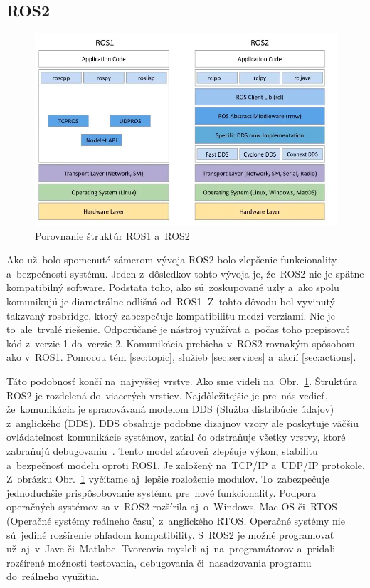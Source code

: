 \subsection{ROS2}
\label{subsec:ros2}

\begin{figure}[!htbp]
	\centering
	\includegraphics[width=15cm]{img/strukturaRos1Ros2.png}
	\caption{Porovnanie štruktúr ROS1 a~ROS2~\cite{comparison}}
	\label{fig:struktury}
\end{figure}

Ako už~bolo spomenuté zámerom vývoja ROS2 bolo zlepšenie funkcionality a~bezpečnosti systému. Jeden z~dôsledkov tohto vývoja je, že~ROS2
nie je spätne kompatibilný software. Podstata toho, ako sú~zoskupované uzly a~ako spolu komunikujú je diametrálne odlišná od~ROS1. Z~tohto dôvodu
bol vyvinutý takzvaný rosbridge, ktorý zabezpečuje kompatibilitu medzi verziami. Nie je to~ale~trvalé riešenie. Odporúčané je nástroj
využívať a~počas toho prepisovať kód z~verzie 1 do~verzie 2. Komunikácia prebieha v~ROS2 rovnakým spôsobom ako v~ROS1. Pomocou tém
\ref{sec:topic}, služieb \ref{sec:services} a~akcií \ref{sec:actions}.

Táto podobnosť končí na~najvyššej vrstve. Ako sme videli na~Obr.~\ref{fig:struktury}. Štruktúra ROS2 je rozdelená do~viacerých vrstiev.
Najdôležitejšie je pre~nás vedieť, že~komunikácia je spracovávaná modelom DDS (Služba distribúcie údajov) z~anglického
(\acrlong{DDS}). DDS obsahuje podobne dizajnov vzory ale poskytuje väčšiu ovládateľnosť komunikácie systémov, zatiaľ
čo odstraňuje všetky vrstvy, ktoré zabraňujú debugovaniu~\cite{ElectronicDesign}. Tento model zároveň zlepšuje výkon,
stabilitu a~bezpečnosť modelu oproti ROS1. Je založený na~TCP/IP a~UDP/IP protokole. Z~obrázku Obr.~\ref{fig:struktury}
vyčítame aj~lepšie rozloženie modulov. To~zabezpečuje jednoduchšie prispôsobovanie systému pre~nové funkcionality. Podpora operačných systémov
sa v~ROS2 rozšírila aj~o~Windows, Mac OS či~RTOS (Operačné systémy reálneho času) z~anglického \acrlong{RTOS}. Operačné systémy nie sú~jediné
rozšírenie ohľadom kompatibility. S~ROS2 je možné programovať už~aj~v~Jave či~Matlabe. Tvorcovia mysleli aj~na~programátorov a~pridali rozšírené
možnosti testovania, debugovania či~nasadzovania programu do~reálneho využitia.

